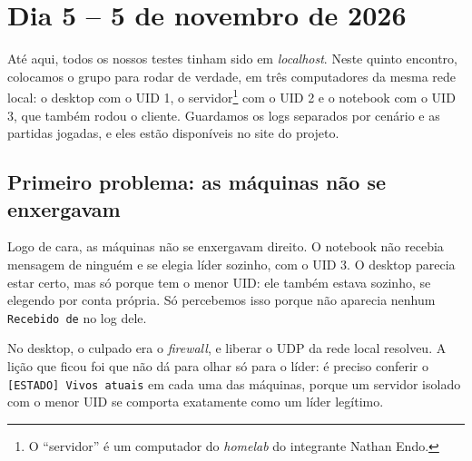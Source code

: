 {}
\section*{Dia 5 -- 5 de novembro de 2026}
\label{dia:5}

Até aqui, todos os nossos testes tinham sido em \textit{localhost}. Neste quinto encontro, colocamos o grupo para rodar de verdade, em três computadores da mesma rede local: o desktop com o UID 1, o servidor\footnote{O ``servidor'' é um computador do \textit{homelab} do integrante Nathan Endo.} com o UID 2 e o notebook com o UID 3, que também rodou o cliente. Guardamos os logs separados por cenário e as partidas jogadas, e eles estão disponíveis no site do projeto.

\subsection*{Primeiro problema: as máquinas não se enxergavam}
Logo de cara, as máquinas não se enxergavam direito. O notebook não recebia mensagem de ninguém e se elegia líder sozinho, com o UID 3. O desktop parecia estar certo, mas só porque tem o menor UID: ele também estava sozinho, se elegendo por conta própria. Só percebemos isso porque não aparecia nenhum \texttt{Recebido de} no log dele.

No desktop, o culpado era o \textit{firewall}, e liberar o UDP da rede local resolveu. A lição que ficou foi que não dá para olhar só para o líder: é preciso conferir o \texttt{[ESTADO] Vivos atuais} em cada uma das máquinas, porque um servidor isolado com o menor UID se comporta exatamente como um líder legítimo.


